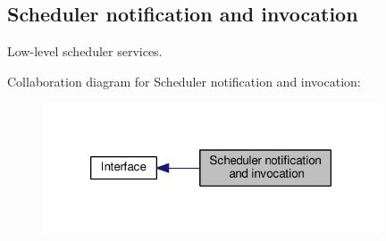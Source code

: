 \hypertarget{group__kern__sched}{\subsection{Scheduler notification and invocation}
\label{group__kern__sched}
}


Low-\/level scheduler services.  


Collaboration diagram for Scheduler notification and invocation\-:\nopagebreak
\begin{figure}[H]
\begin{center}
\leavevmode
\includegraphics[width=282pt]{group__kern__sched}
\end{center}
\end{figure}
